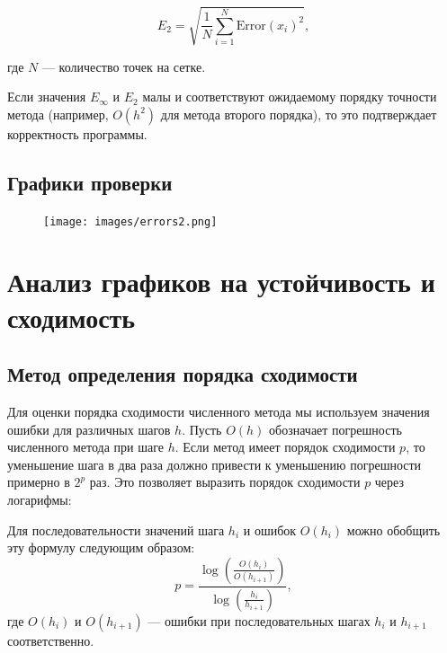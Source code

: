 \documentclass{article}
\begin{document}
  \[
  E_2 = \sqrt{\frac{1}{N} \sum_{i=1}^{N} \text{Error}(x_i)^2},
  \]

где \( N \) — количество точек на сетке.

Если значения \( E_{\infty} \) и \( E_2 \) малы и соответствуют ожидаемому порядку точности метода (например, \( O(h^2) \) для метода второго порядка), то это подтверждает корректность программы.

\subsection{Графики проверки}
\begin{figure}[H]
    \centering
    \texttt{[image: images/errors2.png]}
\end{figure}




    
\section{Анализ графиков на устойчивость и сходимость}

\subsection{Метод определения порядка сходимости}

Для оценки порядка сходимости численного метода мы используем значения ошибки для различных шагов \( h \). Пусть \( O(h) \) обозначает погрешность численного метода при шаге \( h \). Если метод имеет порядок сходимости \( p \), то уменьшение шага в два раза должно привести к уменьшению погрешности примерно в \( 2^p \) раз. Это позволяет выразить порядок сходимости \( p \) через логарифмы:

Для последовательности значений шага \( h_i \) и ошибок \( O(h_i) \) можно обобщить эту формулу следующим образом:
\[
p = \frac{\log \left( \frac{O(h_i)}{O(h_{i+1})} \right)}{\log \left( \frac{h_i}{h_{i+1}} \right)},
\]
где \( O(h_i) \) и \( O(h_{i+1}) \) — ошибки при последовательных шагах \( h_i \) и \( h_{i+1} \) соответственно.
\end{document}
